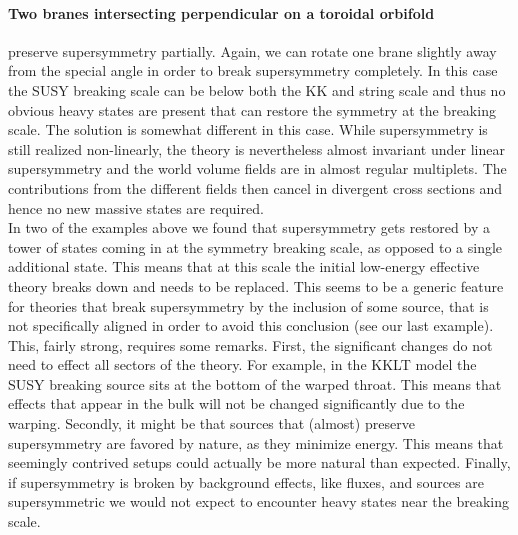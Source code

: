 \documentclass[12pt]{report}
\begin{document}
\paragraph{Two branes intersecting perpendicular on a toroidal orbifold} preserve supersymmetry partially. Again, we can rotate one brane slightly away from the special angle in order to break supersymmetry completely. In this case the SUSY breaking scale can be below both the KK and string scale and thus no obvious heavy states are present that can restore the symmetry at the breaking scale. The solution is somewhat different in this case. While supersymmetry is still realized non-linearly, the theory is nevertheless almost invariant under linear supersymmetry and the world volume fields are in almost regular multiplets. The contributions from the different fields then cancel in divergent cross sections and hence no new massive states are required.\vspace{12pt}\\ %
In two of the examples above we found that supersymmetry gets restored by a tower of states coming in at the symmetry breaking scale, as opposed to a single additional state. This means that at this scale the initial low-energy effective theory breaks down and needs to be replaced. This seems to be a generic feature for theories that break supersymmetry by the inclusion of some source, that is not specifically aligned in order to avoid this conclusion (see our last example).\\
This, fairly strong, requires some remarks. First, the significant changes do not need to effect all sectors of the theory. For example, in the KKLT model the SUSY breaking source sits at the bottom of the warped throat. This means that effects that appear in the bulk will not be changed significantly due to the warping. Secondly, it might be that sources that (almost) preserve supersymmetry are favored by nature, as they minimize energy. This means that seemingly contrived setups could actually be more natural than expected. Finally, if supersymmetry is broken by background effects, like fluxes, and sources are supersymmetric we would not expect to encounter heavy states near the breaking scale.
\end{document}

